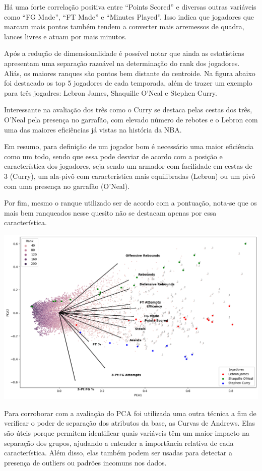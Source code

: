 \documentclass[
]{book}
\begin{document}
Há uma forte correlação positiva entre ``Points Scored'' e diversas outras variáveis como ``FG Made'', ``FT Made'' e ``Minutes Played''. Isso indica que jogadores que marcam mais pontos também tendem a converter mais arremessos de quadra, lances livres e atuam por mais minutos.

Após a redução de dimensionalidade é possível notar que ainda as estatísticas apresentam uma separação razoável na determinação do rank dos jogadores. Aliás, os maiores ranques são pontos bem distante do centroide. Na figura abaixo foi destacado os top 5 jogadores de cada temporada, além de trazer um exemplo para três jogadres: Lebron James, Shaquille O'Neal e Stephen Curry.

Interessante na avaliação dos três como o Curry se destaca pelas cestas dos três, O'Neal pela presença no garrafão, com elevado número de rebotes e o Lebron com uma das maiores eficiências já vistas na história da NBA.

Em resumo, para definição de um jogador bom é necessário uma maior eficiência como um todo, sendo que essa pode desviar de acordo com a posição e característica dos jogadores, seja sendo um armador com facilidade em cestas de 3 (Curry), um ala-pivô com característica mais equilibradas (Lebron) ou um pivô com uma presença no garrafão (O'Neal).

Por fim, mesmo o ranque utilizado ser de acordo com a pontuação, nota-se que os mais bem ranqueados nesse quesito não se destacam apenas por essa característica.

\includegraphics{imagens/6.png}

Para corroborar com a avaliação do PCA foi utilizada uma outra técnica a fim de verificar o poder de separação dos atributos da base, as Curvas de Andrews. Elas são úteis porque permitem identificar quais variáveis têm um maior impacto na separação dos grupos, ajudando a entender a importância relativa de cada característica. Além disso, elas também podem ser usadas para detectar a presença de outliers ou padrões incomuns nos dados.
\end{document}

